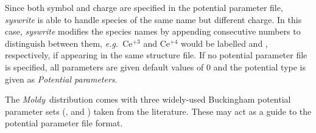 \documentclass[a4paper,twoside]{report}
\newcommand{\moldy}{\emph{Moldy}}
\newcommand{\eg}{\emph{e.g.}}
\begin{document}
Since both symbol and charge are specified in the potential parameter file,
\emph{syswrite} is able to handle species of the same name but different charge.
In this case, \emph{syswrite} modifies the species names by appending consecutive
numbers to distinguish between them, \eg\ Ce$^{+3}$ and Ce$^{+4}$ would be labelled
 and , respectively, if appearing in the same
structure file. If no potential parameter file is specified, all
parameters are given default values of 0 and the potential type is given
as \textit{Potential parameters}.

The \moldy\ distribution comes with three widely-used Buckingham potential
parameter sets (,  and
) taken from the literature. These may act as a guide
to the potential parameter file format.



\end{document}
